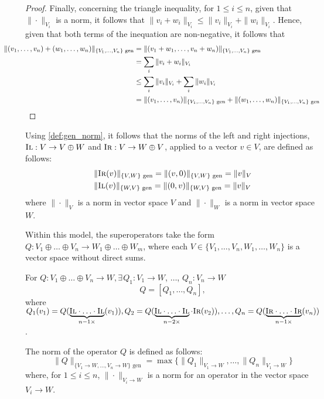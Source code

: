 \begin{proof}
Finally, concerning the triangle inequality, for $ 1 \leq i \leq n$,  given that  $\|\cdot\|_{V_i}$ is a norm, it follows that $\|v_i + w_i\|_{V_i} \leq \|v_i\|_{V_i} + \|w_i\|_{V_i}$. Hence, given that both terms of the inequation are non-negative, it follows that
\begin{align*}
   \hspace {-30pt}\|(v_1, \ldots, v_n) + (w_1, \ldots, w_n)\|_{\{V_1,\ldots,V_n\} \text{ gen}} & = \|(v_1 + w_1, \ldots, v_n + w_n)\|_{\{V_1,\ldots,V_n\} \text{ gen}} \\
  & = \sum_i \|v_i + w_i\|_{V_i} \\
  &\leq \sum_i \|v_i\|_{V_i} + \sum_i \|w_i\|_{V_i} \\
  &=\|(v_1, \ldots, v_n)\|_{\{V_1,\ldots,V_n\} \text{ gen}} + \|(w_1, \ldots, w_n)\|_{\{V_1,\ldots,V_n\} \text{ gen}}  \\
\end{align*}
\end{proof}

Using \autoref{def:gen_norm}, it follows that the norms of the left and right injections, $\textsc{Il}: V \rightarrow V \oplus W$ and $\textsc{Ir}:V \rightarrow W \oplus V$, applied to a vector $v \in V$, are defined as follows:
  \begin{equation} \label{eq:gen_norm_injections}
    \begin{split}
    &\|\textsc{Ir}(v)\|_{\{V, W\} \text{ gen}} =  \| (v,0) \|_{\{ V, W\} \text{ gen}} = \|v\|_{V} \\
    &\|\textsc{Il}(v)\|_{\{ W,  V\} \text{ gen}} =  \| (0,v) \|_{\{ W,  V\} \text{ gen}} = \|v\|_{V}
    \end{split}
  \end{equation}
where $\|\cdot\|_{V}$ is a norm in vector space $V$ and $\|\cdot\|_{W}$ is a norm in vector space $W$.


 
Within this model, the superoperators take the form $Q: V_1 \oplus \ldots \oplus V_n  \rightarrow  W_1 \oplus \ldots \oplus W_m$, where each $V \in \{V_1, \ldots, V_n, W_1, \ldots, W_n\}$ is a vector space without direct sums.

\begin{definition} \label{def:gen_norm_either}
For $Q: V_1 \oplus \ldots \oplus V_n  \rightarrow W, \exists \hspace{1pt} Q_1: V_1 \rightarrow W$, $\ldots$, $Q_n: V_n \rightarrow W$  $$Q=[Q_1, \ldots, Q_n],$$ where $Q_1 (v_1) = Q (\underbrace{\textsc{Il} \cdot \ldots \cdot \textsc{Il}}_{n-1 \times } (v_1)), Q_2 = Q(\underbrace{\textsc{Il} \cdot \ldots \cdot \textsc{Il}}_{n-2 \times } \cdot \textsc{Ir} (v_2)), \ldots, Q_n = Q( \underbrace{\textsc{Ir} \cdot \ldots \cdot \textsc{Ir}}_{n-1 \times } (v_n))$.

The norm of the operator $Q$ is defined as follows:
\begin{equation}
\|Q\|_{\{V_1\rightarrow W, \ldots, V_n\rightarrow W\} \text{ gen}} = \max \{\|Q_1\|_{V_1 \rightarrow W}, \ldots, \|Q_n\|_{V_1 \rightarrow W}  \}
\end{equation}
where, for $1 \leq i \leq n $, $\|\cdot \|_{V_i \rightarrow W}$ is a norm for an operator in the vector space $V_i \rightarrow W$.
\end{definition}

